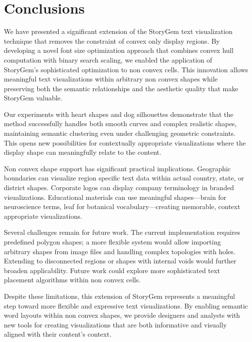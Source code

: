 \documentclass{vgtc}                          %
\begin{document}
\section{Conclusions}

We have presented a significant extension of the StoryGem text visualization technique that removes the constraint of convex only display regions.
By developing a novel font size optimization approach that combines convex hull computation with binary search scaling, we enabled the application of StoryGem's sophisticated optimization to non convex cells.
This innovation allows meaningful text visualizations within arbitrary non convex shapes while preserving both the semantic relationships and the aesthetic quality that make StoryGem valuable.

Our experiments with heart shapes and dog silhouettes demonstrate that the method successfully handles both smooth curves and complex realistic shapes, maintaining semantic clustering even under challenging geometric constraints.
This opens new possibilities for contextually appropriate visualizations where the display shape can meaningfully relate to the content.

Non convex shape support has significant practical implications.
Geographic boundaries can visualize region specific text data within actual country, state, or district shapes.
Corporate logos can display company terminology in branded visualizations.
Educational materials can use meaningful shapes—brain for neuroscience terms, leaf for botanical vocabulary—creating memorable, context appropriate visualizations.

Several challenges remain for future work.
The current implementation requires predefined polygon shapes; a more flexible system would allow importing arbitrary shapes from image files and handling complex topologies with holes.
Extending to disconnected regions or shapes with internal voids would further broaden applicability.
Future work could explore more sophisticated text placement algorithms within non convex cells.

Despite these limitations, this extension of StoryGem represents a meaningful step toward more flexible and expressive text visualizations.
By enabling semantic word layouts within non convex shapes, we provide designers and analysts with new tools for creating visualizations that are both informative and visually aligned with their content's context.



\end{document}
